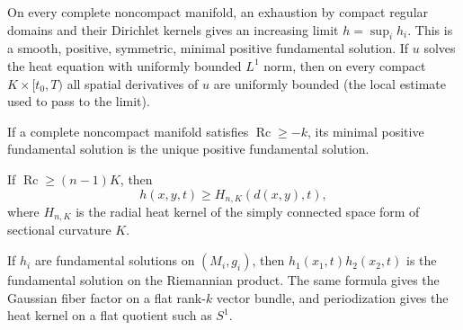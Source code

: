 \begin{theorem}
\label{thm:chow-ii-minimal-positive-heat-kernel}
On every complete noncompact manifold, an exhaustion by compact regular
domains and their Dirichlet kernels gives an increasing limit $h=\sup_i h_i$.
This is a smooth, positive, symmetric, minimal positive fundamental solution.
If $u$ solves the heat equation with uniformly bounded $L^1$ norm, then on
every compact $K\times[t_0,T)$ all spatial derivatives of $u$ are uniformly
bounded (the local estimate used to pass to the limit).
\end{theorem}

\begin{theorem}
\label{thm:chow-ii-heat-kernel-uniqueness-lower-ricci}
If a complete noncompact manifold satisfies $\operatorname{Rc}\ge-k$, its
minimal positive fundamental solution is the unique positive fundamental
solution.
\end{theorem}

\begin{theorem}
\label{thm:chow-ii-cheeger-yau-heat-comparison}
If $\operatorname{Rc}\ge(n-1)K$, then
\[
h(x,y,t)\ge H_{n,K}(d(x,y),t),
\]
where $H_{n,K}$ is the radial heat kernel of the simply connected space form
of sectional curvature $K$.
\end{theorem}

\begin{theorem}
\label{thm:chow-ii-heat-kernel-products}
If $h_i$ are fundamental solutions on $(M_i,g_i)$, then
$h_1(x_1,t)h_2(x_2,t)$ is the fundamental solution on the Riemannian product.
The same formula gives the Gaussian fiber factor on a flat rank-$k$ vector
bundle, and periodization gives the heat kernel on a flat quotient such as
$S^1$.
\end{theorem}

